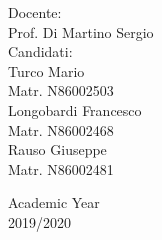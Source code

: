 \begin{center}
\begin{multicols}{2}
	{\large Docente:\\}
	Prof. Di Martino Sergio\\
	\vspace{10mm}
	\columnbreak
	{\large Candidati:\\}
	Turco Mario\\
	Matr. N86002503\\
	Longobardi Francesco\\
	Matr. N86002468\\
	Rauso Giuseppe\\
	Matr. N86002481
	\vspace{10mm}
\end{multicols}

\vfill

{\large Academic Year\\ 2019/2020}

\end{center}



%
%
\newpage
\openright

\tableofcontents

%
%



